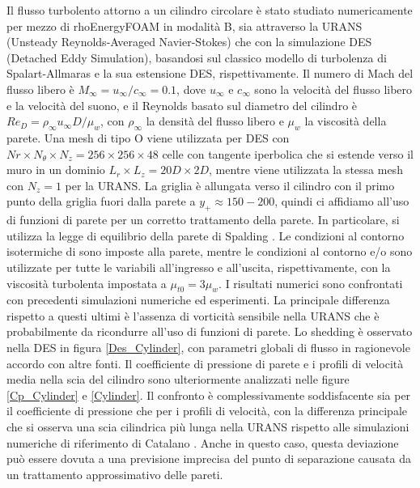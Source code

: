\documentclass[a5paper]{sapthesis}
\begin{document}
	Il flusso turbolento attorno a un cilindro circolare è stato studiato numericamente per mezzo di rhoEnergyFOAM in modalità B, sia attraverso la URANS (Unsteady Reynolds-Averaged Navier-Stokes) che con la simulazione DES (Detached Eddy Simulation), basandosi sul classico modello di turbolenza di Spalart-Allmaras e la sua estensione DES, rispettivamente. Il numero di Mach del flusso libero è $M_\infty = u_\infty /c_\infty = 0.1$, dove $u_\infty$ e $c_\infty$ sono la velocità del flusso libero e la velocità del suono, e il Reynolds basato sul diametro del cilindro è $Re_D = \rho_\infty u_\infty D/ \mu_w$, con $\rho_\infty$ la densità del flusso libero e $\mu_w$ la viscosità della parete. Una mesh di tipo O viene utilizzata per DES con $Nr \times N_\theta \times N_z = 256 \times 256 \times 48$ celle con tangente iperbolica che si estende verso il muro in un dominio $L_r \times L_z = 20D \times 2D$, mentre viene utilizzata la stessa mesh con $N_z = 1$ per la URANS.
	La griglia è allungata verso il cilindro con il primo punto della griglia fuori dalla parete a $y_+ \approx 150 - 200$, quindi ci affidiamo all'uso di funzioni di parete per un corretto trattamento della parete. In particolare, si utilizza la legge di equilibrio della parete di Spalding \citep{spalding1961single}. Le condizioni al contorno isotermiche di  sono imposte alla parete, mentre le condizioni al contorno  e/o  sono utilizzate per tutte le variabili all'ingresso e all'uscita, rispettivamente, con la viscosità turbolenta impostata a $\mu_{t0} = 3\mu_w$. I risultati numerici sono confrontati con precedenti simulazioni numeriche ed esperimenti. La principale differenza rispetto a questi ultimi è l'assenza di vorticità sensibile nella URANS che è probabilmente da ricondurre all'uso di funzioni di parete. Lo shedding è osservato nella DES in figura \ref{Des_Cylinder}, con parametri globali di ﬂusso in ragionevole accordo con altre fonti. Il coefficiente di pressione di parete e i proﬁli di velocità media nella scia del cilindro sono ulteriormente analizzati nelle ﬁgure \ref{Cp_Cylinder} e \ref{Cylinder}. Il confronto è complessivamente soddisfacente sia per il coefficiente di pressione che per i proﬁli di velocità, con la differenza principale che si osserva una scia cilindrica più lunga nella URANS rispetto alle simulazioni numeriche di riferimento di Catalano \citep{Catalano}. Anche in questo caso, questa deviazione può essere dovuta a una previsione imprecisa del punto di separazione causata da un trattamento approssimativo delle pareti.
	
\end{document}
